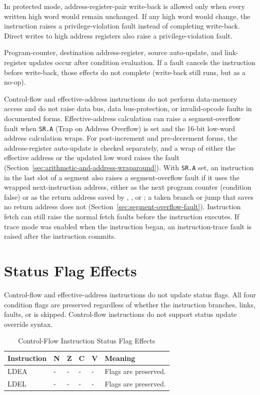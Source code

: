 In protected mode, address-register-pair write-back is allowed only when every written high word would remain
unchanged. If any high word would change, the instruction raises a privilege-violation fault instead of completing
write-back. Direct writes to high address registers also raise a privilege-violation fault.

Program-counter, destination address-register, source auto-update, and link-register updates occur after condition
evaluation. If a fault cancels the instruction before write-back, those effects do not complete (write-back still runs,
but as a no-op).

\noindent Control-flow and effective-address instructions do not perform data-memory access and do not raise data bus,
data bus-protection, or invalid-opcode faults in documented forms. Effective-address calculation can raise a
segment-overflow fault when \texttt{SR.A} (Trap on Address Overflow) is set and the 16-bit low-word address calculation
wraps. For post-increment and pre-decrement forms, the address-register auto-update is checked separately, and a wrap of
either the effective address or the updated low word raises the fault
(Section~\ref{sec:arithmetic-and-address-wraparound}). With \texttt{SR.A} set, an instruction in the last slot of a segment also raises a segment-overflow fault if it
uses the wrapped next-instruction address, either as the next program counter (condition false) or as the return
address saved by , , or ; a taken branch or jump that saves no return
address does not (Section~\ref{sec:segment-overflow-fault}). Instruction fetch can still raise the normal fetch faults
before the instruction executes. If trace mode was
enabled when the instruction began, an instruction-trace fault is raised after the instruction commits.

\section{Status Flag Effects}

Control-flow and effective-address instructions do not update status flags. All four condition flags are preserved
regardless of whether the instruction branches, links, faults, or is skipped. Control-flow instructions do not support
status update override syntax.

\begin{table}[H]
	\centering
	\begin{tabular}{lllllp{5.5cm}}
		\toprule
		\textbf{Instruction} & \textbf{N} & \textbf{Z} & \textbf{C} & \textbf{V} & \textbf{Meaning}     \\
		\midrule
		LDEA                 & -          & -          & -          & -          & Flags are preserved. \\
		LDEL                 & -          & -          & -          & -          & Flags are preserved. \\
		\bottomrule
	\end{tabular}
	\caption{Control-Flow Instruction Status Flag Effects}
	\label{tab:control-flow-status-flag-effects}
\end{table}

